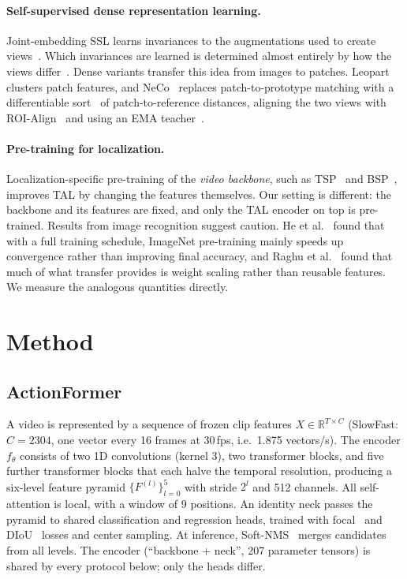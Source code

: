 \documentclass[10pt,a4paper]{article}
\begin{document}
\paragraph{Self-supervised dense representation learning.}
Joint-embedding SSL learns invariances to the augmentations used to create
views~\cite{chen2020simclr,grill2020byol,caron2021dino}. Which invariances are learned is
determined almost entirely by how the views differ~\cite{tian2020goodviews}. Dense
variants transfer this idea from images to patches. Leopart~\cite{ziegler2022leopart}
clusters patch features, and NeCo~\cite{pariza2025neco} replaces patch-to-prototype
matching with a differentiable sort~\cite{prillo2020softsort} of patch-to-reference
distances, aligning the two views with ROI-Align~\cite{he2017maskrcnn} and using an EMA
teacher~\cite{tarvainen2017meanteacher}.

\paragraph{Pre-training for localization.}
Localization-specific pre-training of the \emph{video backbone}, such as
TSP~\cite{alwassel2021tsp} and BSP~\cite{xu2021bsp}, improves TAL by changing the features
themselves. Our setting is different: the backbone and its features are fixed, and only
the TAL encoder on top is pre-trained. Results from image recognition suggest caution.
He et al.~\cite{he2019rethinking} found that with a full training schedule, ImageNet
pre-training mainly speeds up convergence rather than improving final accuracy, and Raghu
et al.~\cite{raghu2019transfusion} found that much of what transfer provides is weight
scaling rather than reusable features. We measure the analogous quantities directly.

\section{Method}\label{sec:method}

\subsection{ActionFormer}
A video is represented by a sequence of frozen clip features $X\in\mathbb{R}^{T\times C}$
(SlowFast: $C{=}2304$, one vector every 16 frames at 30\,fps, i.e.\ 1.875 vectors/s).
The encoder $f_\theta$ consists of two 1D convolutions (kernel 3), two transformer blocks,
and five further transformer blocks that each halve the temporal resolution, producing a
six-level feature pyramid $\{F^{(l)}\}_{l=0}^{5}$ with stride $2^l$ and 512 channels. All
self-attention is local, with a window of 9 positions. An identity neck passes the pyramid to
shared classification and regression heads, trained with focal~\cite{lin2017focal} and
DIoU~\cite{zheng2020diou} losses and center sampling. At inference,
Soft-NMS~\cite{bodla2017softnms} merges candidates from all levels. The encoder
(``backbone + neck'', 207 parameter tensors) is shared by every protocol below; only the
heads differ.
\end{document}
